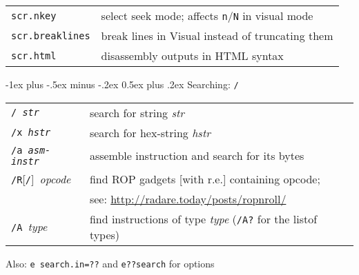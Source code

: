 \documentclass[a4paper,landscape]{article}
\makeatletter
\renewcommand{\section}{\@startsection{section}{1}{0mm}%
                                {-1ex plus -.5ex minus -.2ex}%
                                {0.5ex plus .2ex}%
                                {\normalfont\large\bfseries}}
\renewcommand{\subsubsection}{\@startsection{subsubsection}{3}{0mm}%
                                {-1ex plus -.5ex minus -.2ex}%
                                {1ex plus .2ex}%
                                {\normalfont\small\bfseries}}
\makeatother
\begin{document}
\begin{multicols*}{3}
\begin{tabular}{@{}ll@{}}
\texttt{scr.nkey} & select seek mode; affects \texttt{n}/\texttt{N} in visual mode \\
\texttt{scr.breaklines} & break lines in Visual instead of truncating them \\
\texttt{scr.html} & disassembly outputs in HTML syntax \\
\end{tabular}

\section{Searching: \texttt{/}}
\begin{tabular}{@{}ll@{}}
\texttt{/ \textit{str}} & search for string \textit{str} \\
\texttt{/x \textit{hstr}} & search for hex-string \textit{hstr} \\
\texttt{/a \textit{asm-instr}} & assemble instruction and search for its bytes \\
\texttt{/R}[\texttt{/}]\ \textit{opcode} & find ROP gadgets [with r.e.] containing opcode; \\ & see: \url{http://radare.today/posts/ropnroll/} \\
\texttt{/A }\textit{type} & find instructions of type \textit{type} (\texttt{/A?} for the listof types) \\
\end{tabular}

Also: \texttt{e search.in=??} and \texttt{e??search} for options


\end{multicols*}
\end{document}

